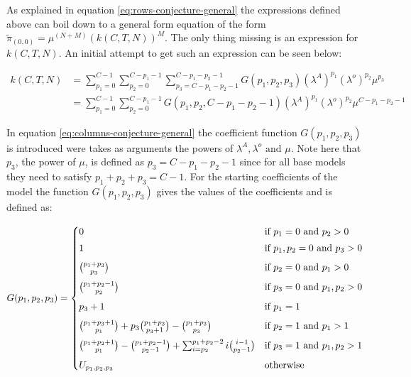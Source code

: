\newpage
As explained in equation \ref{eq:rows-conjecture-general} the expressions defined above can boil down to a general form equation of the form \(\tilde{\pi}_{(0,0)} = \mu^{(N+M)} (k(C,T,N))^M\). 
The only thing missing is an expression for \(k(C,T,N)\). 
An initial attempt to get such an expression can be seen below:

\begin{align}\label{eq:columns-conjecture-general}
    k(C,T,N) &= \sum_{p_1=0}^{C-1} \sum_{p_2=0}^{C-p_1-1} \sum_{p_3=C - p_1 - p_2 - 1}^{C - p_1 - p_2 - 1} G(p_1, p_2, p_3) (\lambda^A)^{p_1} (\lambda^o)^{p_2} \mu^{p_3} \nonumber \\ 
    &= \sum_{p_1=0}^{C-1} \sum_{p_2=0}^{C-p_1-1} G(p_1, p_2, C-p_1-p_2-1) (\lambda^A)^{p_1} (\lambda^o)^{p_2} \mu^{C-p_1-p_2-1} 
\end{align}

In equation \ref{eq:columns-conjecture-general} the coefficient function \(G(p_1,p_2,p_3)\) is introduced were takes as arguments the powers of \(\lambda^A, \lambda^o \text{ and } \mu\). 
Note here that \(p_3\), the power of \(\mu\), is defined as \(p_3=C-p_1-p_2-1\) since for all base models they need to satisfy \(p_1 + p_2 + p_3 = C-1\). 
For the starting coefficients of the model the function \(G(p_1,p_2,p_3)\) gives the values of the coefficients and is defined as:

\begin{equation} \label{eq:coefficient-function}
    G(p_1,p_2,p_3) = 
    \begin{cases}
        0 & \text{if } p_1 = 0 \text{ and } p_2 > 0 \vspace{0.1cm} \\
        1 & \text{if } p_1, p_2 = 0 \text{ and } p_3 > 0 \vspace{0.2cm} \\
        \binom{p_1 + p_3}{p_3} & \text{if } p_2 = 0 \text{ and } p_1 > 0 \vspace{0.2cm} \\
        \binom{p_1 + p_2 - 1}{p_2} & \text{if } p_3 = 0 \text{ and } p_1, p_2 > 0 \vspace{0.2cm} \\
        p_3 + 1 & \text{if } p_1 = 1 \vspace{0.2cm} \\
        \binom{p_1 + p_3 + 1}{p_1} + p_3 \binom{p_1 + p_3}{p_3+1} - \binom{p_1 + p_3}{p_3} & \text{if } p_2 = 1 \text{ and } p_1 > 1 \vspace{0.2cm} \\
        \binom{p_1 + p_2 + 1}{p_1} - \binom{p_1 + p_2 - 1}{p_2-1} + \sum_{i=p_2}^{p_1 + p_2 - 2} i \binom{i-1}{p_2 - 1} & \text{if } p_3 = 1 \text{ and } p_1,p_2 > 1 \vspace{0.2cm} \\
        U_{p_1,p_2,p_3} & \text{otherwise}
    \end{cases}
\end{equation}

